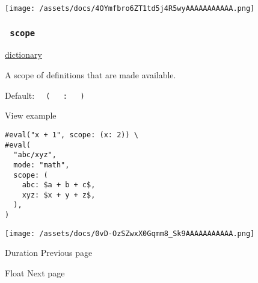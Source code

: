 \texttt{[image: /assets/docs/4OYmfbro6ZT1td5j4R5wyAAAAAAAAAAA.png]}

\subsubsection{\texorpdfstring{\texttt{\ scope\ }}{ scope }}\label{parameters-scope}

\href{/docs/reference/foundations/dictionary/}{dictionary}

A scope of definitions that are made available.

Default:
\texttt{\ }{\texttt{\ (\ }}\texttt{\ }{\texttt{\ :\ }}\texttt{\ }{\texttt{\ )\ }}\texttt{\ }


View example

\begin{verbatim}
#eval("x + 1", scope: (x: 2)) \
#eval(
  "abc/xyz",
  mode: "math",
  scope: (
    abc: $a + b + c$,
    xyz: $x + y + z$,
  ),
)
\end{verbatim}

\texttt{[image: /assets/docs/0vD-OzSZwxX0Gqmm8\_Sk9AAAAAAAAAAA.png]}

\href{/docs/reference/foundations/duration/}{\pandocbounded{}}

{ Duration } { Previous page }

\href{/docs/reference/foundations/float/}{\pandocbounded{}}

{ Float } { Next page }
